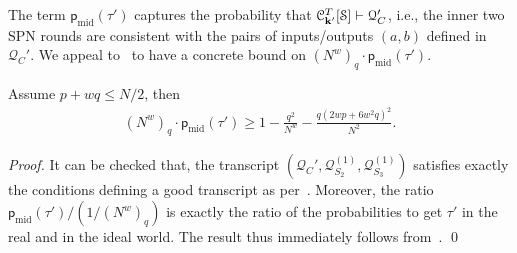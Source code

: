 The term $\mathsf{p}_{\mathrm{mid}}(\tau')$ captures the probability that $\mathcal{C}_{\mathbf{k}'}^T[\mathcal{S}] \vdash \mathcal{Q}_C'$, i.e., the inner two SPN rounds are consistent with the pairs of inputs/outputs $(a,b)$ defined in $\mathcal{Q}_C'$. We appeal to~\cite{EPRINT:CogLee18} to have a concrete bound on $(N^w)_q\cdot\mathsf{p}_{\mathrm{mid}}(\tau')$.

\begin{lemma}
	\label{lemma:bound-middle-two-rounds}
	
	Assume $p+wq\leq N/2$, then
	\begin{align}
	(N^w)_q\cdot\mathsf{p}_{\mathrm{mid}}(\tau') \geq 1-\frac{q^2}{N^w}-\frac{q(2wp+6w^2q)^2}{N^2}.
	\label{eq:bound-on-epsilon-mid}
	\end{align}
\end{lemma}
\begin{proof}
It can be checked that, the transcript $(\mathcal{Q}_C',\mathcal{Q}_{S_2}^{(1)},\mathcal{Q}_{S_3}^{(1)})$ satisfies exactly the conditions defining a good transcript as per~\cite[page 16]{EPRINT:CogLee18}. Moreover,
the ratio $\mathsf{p}_{\mathrm{mid}}(\tau')/(1/(N^w)_q)$ is exactly the ratio of the probabilities to get $\tau'$ in the real and in the ideal world. The result thus immediately follows from~\cite[Lemma 9]{EPRINT:CogLee18}.             \qed
\end{proof}



%



